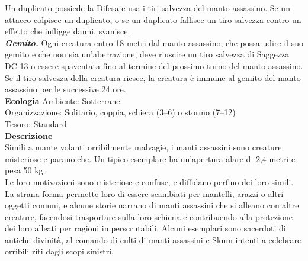 \begin{multicols}{2}
Un duplicato possiede la Difesa e usa i tiri salvezza del manto assassino. Se un attacco colpisce un duplicato, o se un duplicato fallisce un tiro salvezza contro un effetto che infligge danni, svanisce.\\
\emph{\textbf{Gemito.}} Ogni creatura entro 18 metri dal manto assassino, che possa udire il suo gemito e che non sia un'aberrazione, deve riuscire un tiro salvezza di Saggezza DC 13 o essere spaventata fino al termine del prossimo turno del manto assassino. Se il tiro salvezza della creatura riesce, la creatura è immune al gemito del manto assassino per le successive 24 ore.\\
\textbf{Ecologia}
Ambiente: Sotterranei\\
Organizzazione: Solitario, coppia, schiera (3–6) o stormo (7–12)\\
Tesoro: Standard\\
\textbf{Descrizione}\\
Simili a mante volanti orribilmente malvagie, i manti assassini sono creature misteriose e paranoiche. Un tipico esemplare ha un’apertura alare di 2,4 metri e pesa 50 kg.\\

Le loro motivazioni sono misteriose e confuse, e diffidano perfino dei loro simili. La strana forma permette loro di essere scambiati per mantelli, arazzi o altri oggetti comuni, e alcune storie narrano di manti assassini che si alleano con altre creature, facendosi trasportare sulla loro schiena e contribuendo alla protezione dei loro alleati per ragioni imperscrutabili. Alcuni esemplari sono sacerdoti di antiche divinità, al comando di culti di manti assassini e Skum intenti a celebrare orribili riti dagli scopi sinistri.\\



\end{multicols}
